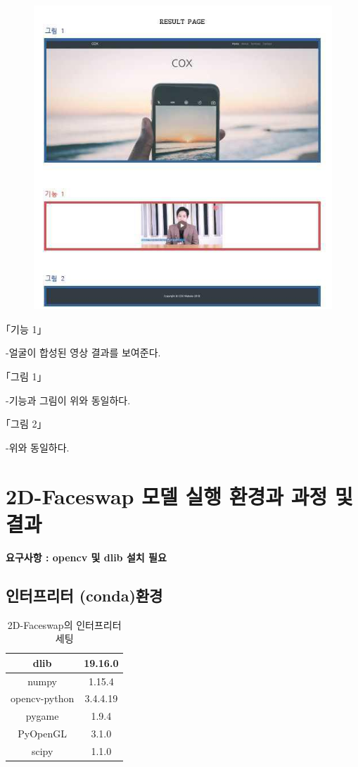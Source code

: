 \documentclass[chapter,oneside]{oblivoir}
\begin{document}
\newpage
\begin{figure}[h!]
    \centering
    \includegraphics{pic/chp6/img945}
\end{figure}

｢기능 1｣

-얼굴이 합성된 영상 결과를 보여준다.

｢그림 1｣

-기능과 그림이 위와 동일하다.

｢그림 2｣

-위와 동일하다.

\section{ 2D-Faceswap 모델 실행 환경과 과정 및 결과}

\textbf{요구사항 :  opencv 및 dlib 설치 필요}

\subsection{인터프리터 (conda)환경}

\begin{table}[h!]
\centering
\begin{tabular}{|c|c|}
    \hline\hline
    dlib & 19.16.0 \\ \hline
    numpy & 1.15.4 \\             \hline
    opencv-python & 3.4.4.19\\             \hline
    pygame & 1.9.4 \\            \hline
    PyOpenGL & 3.1.0 \\            \hline
    scipy  &  1.1.0\\
    \hline\hline
\end{tabular}
\caption{2D-Faceswap의 인터프리터 세팅  }
\end{table}
\end{document}
